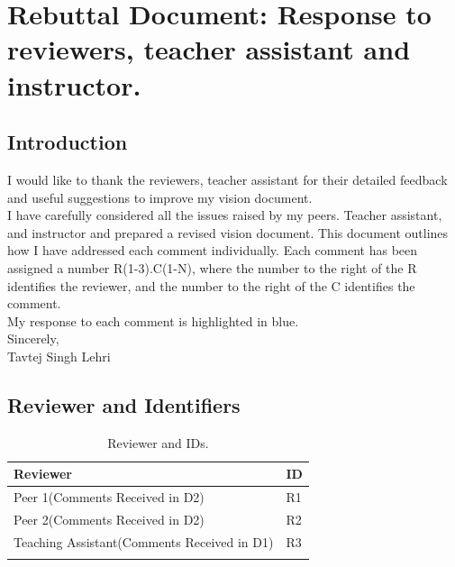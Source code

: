 \documentclass{report}
\begin{document}
\chapter{Rebuttal Document: Response to reviewers, teacher assistant and instructor.}
\section{Introduction}
I would like to thank the reviewers, teacher assistant for their detailed feedback and useful suggestions to improve my vision document.\\[0.3cm]
I have carefully considered all the issues raised by my peers. Teacher assistant,  and instructor and prepared a revised vision document. This document outlines how I have addressed each comment individually. Each comment has been assigned a number R(1-3).C(1-N), where the number to the right of the R identifies the reviewer, and the number to the right of the C identifies the comment.\\[0.3cm]
My response to each comment is highlighted in blue.\\[0.3cm]
Sincerely,\\
Tavtej Singh Lehri

\section{Reviewer and Identifiers}
\begin{longtable}{|p{5.5cm}|p{6.5cm}|} \hline
\textbf{Reviewer}&\textbf{ID}\\ \hline
Peer 1(Comments Received in D2)& R1 \\ \hline
Peer 2(Comments Received in D2)& R2 \\ \hline
Teaching Assistant(Comments Received in D1)& R3\\ \hline
\caption{Reviewer and IDs.\label{long}}\\
\end{longtable}
\end{document}
